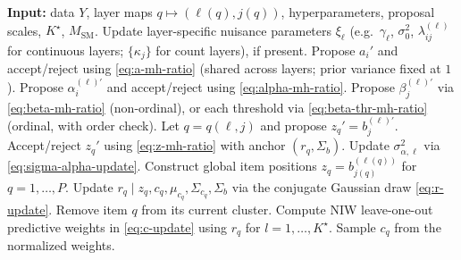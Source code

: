 \documentclass[11pt]{article}
\begin{document}
\begin{algorithm}[H]
\caption{One MCMC sweep: LSIRM updates and auxiliary positions}
\small
\begin{algorithmic}[1]
\State \textbf{Input:} data $Y$, layer maps $q\mapsto(\ell(q),j(q))$, hyperparameters, proposal scales, $K^\star$, $M_{\mathrm{SM}}$.
\State Update layer-specific nuisance parameters $\xi_\ell$ (e.g.\ $\gamma_\ell$, $\sigma_0^2$, $\lambda_{ij}^{(\ell)}$ for continuous layers; $\{\kappa_j\}$ for count layers), if present.
    \State Propose $a_i'$ and accept/reject using \eqref{eq:a-mh-ratio} (shared across layers; prior variance fixed at $1$).
\EndFor
{}
        \State Propose $\alpha_i^{(\ell)\prime}$ and accept/reject using \eqref{eq:alpha-mh-ratio}.
    \EndFor
        \State Propose $\beta_j^{(\ell)\prime}$ via \eqref{eq:beta-mh-ratio} (non-ordinal), or each threshold via \eqref{eq:beta-thr-mh-ratio} (ordinal, with order check).
        \State Let $q=q(\ell,j)$ and propose $z_q'=b_j^{(\ell)\prime}$.
        \State Accept/reject $z_q'$ using \eqref{eq:z-mh-ratio} with anchor $(r_q,\Sigma_b)$.
    \EndFor
    \State Update $\sigma_{\alpha,\ell}^2$ via \eqref{eq:sigma-alpha-update}.
\EndFor
\State Construct global item positions $z_q=b_{j(q)}^{(\ell(q))}$ for $q=1,\dots,P$.
    \State Update $r_q\mid z_q,c_q,\mu_{c_q},\Sigma_{c_q},\Sigma_b$ via the conjugate Gaussian draw \eqref{eq:r-update}.
\EndFor
{}
    \State Remove item $q$ from its current cluster.
    \State Compute NIW leave-one-out predictive weights in \eqref{eq:c-update} using $r_q$ for $l=1,\dots,K^\star$.
    \State Sample $c_q$ from the normalized weights.
\EndFor
\end{algorithmic}
\end{algorithm}
\end{document}
